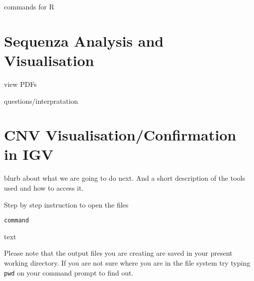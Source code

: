 commands for R


\newpage


\section{Sequenza Analysis and Visualisation}

view PDFs

questions/interpratation


\newpage


\section{CNV Visualisation/Confirmation in IGV}

blurb about what we are going to do next. And a short description of the tools used and how to access it.

\begin{steps}
Step by step instruction to open the files 

\begin{lstlisting}
command
\end{lstlisting}
\end{steps}

text

\begin{note}
Please note that the output files you are creating are saved in your present working directory. If you are not sure where you are in the file system try typing \texttt{pwd} on your command prompt to find out.
\end{note}


\newpage

